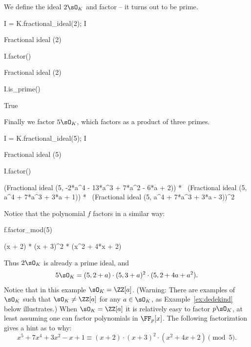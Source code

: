 \noindent
We define the ideal $2\sO_K$ and factor -- it turns out to be prime.

\begin{sagecode}
\begin{sagecell}
I = K.fractional_ideal(2); I
\end{sagecell}
\begin{sageout}
Fractional ideal (2)
\end{sageout}
\begin{sagecell}
I.factor()
\end{sagecell}
\begin{sageout}
Fractional ideal (2)
\end{sageout}
\begin{sagecell}
I.is_prime()
\end{sagecell}
\begin{sageout}
True
\end{sageout}
\end{sagecode} %

\noindent
Finally we factor $5\sO_K$, which factors as a product of three primes.

\begin{sagecode}
\begin{sagecell}
I = K.fractional_ideal(5); I
\end{sagecell}
\begin{sageout}
Fractional ideal (5)
\end{sageout}
\begin{sagecell}
I.factor()
\end{sagecell}
\begin{sageout}
(Fractional ideal (5, -2*a^4 - 13*a^3 + 7*a^2 - 6*a + 2)) * \
(Fractional ideal (5, a^4 + 7*a^3 + 3*a + 1)) * \
(Fractional ideal (5, a^4 + 7*a^3 + 3*a - 3))^2
\end{sageout}
\end{sagecode} %

\noindent
Notice that the polynomial $f$ factors in a similar way:

\begin{sagecode} %
\begin{sagecell}
f.factor_mod(5)
\end{sagecell}
\begin{sageout}
(x + 2) * (x + 3)^2 * (x^2 + 4*x + 2)
\end{sageout}
\end{sagecode}
Thus $2\sO_K$ is already a prime ideal, and
$$
  5\sO_K = (5,2+a)\cdot(5,3+a)^2\cdot(5,2+4a+a^2).
$$
Notice that in this example $\sO_K=\ZZ[a]$. (Warning: There are examples of
$\sO_K$ such that $\sO_K\neq \ZZ[a]$ for any $a\in\sO_K$, as
Example~\ref{ex:dedekind} below illustrates.) When $\sO_K=\ZZ[a]$ it is
relatively easy to factor $p\sO_K$, at least assuming one can factor
polynomials in $\FF_p[x]$.
The following factorization gives a hint as to why:
$$
  x^5+7x^4+3x^2-x+1 \equiv (x+2) \cdot (x+3)^2 \cdot (x^2+4x+2)\pmod{5}.
$$


